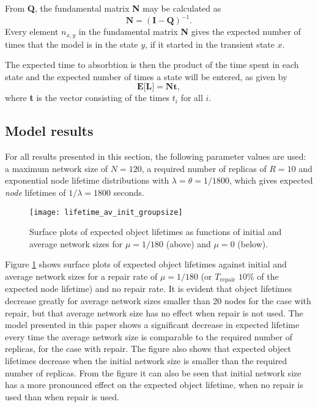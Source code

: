 From \textbf{Q}, the fundamental matrix \textbf{N} may be calculated as \cite{grinstead1997introduction_probability}
%
\begin{equation} \label{eq_fundamental_mat}
    \textbf{N} = (\textbf{I} - \textbf{Q})^{-1}.
\end{equation}
%
Every element $n_{x,y}$ in the fundamental matrix \textbf{N} gives the expected number of times that the model is in the state $y$, if it started in the transient state $x$.

The expected time to absorbtion is then the product of the time spent in each state and the expected number of times a state will be entered, as given by
%
\begin{equation} \label{expected_lifetime}
    \textbf{E[L]} = \textbf{Nt},
\end{equation}
%
where \textbf{t} is the vector consisting of the times $t_i$ for all $i$.

\subsection{Model results}
\label{results}

For all results presented in this section, the following parameter values are used: a maximum network size of $N=120$, a required number of replicas of $R = 10$ and exponential node lifetime distributions with $\lambda = \theta = 1/1800$, which gives expected \emph{node} lifetimes of $1/\lambda = 1800$ seconds.


\begin{figure}[htbp]
 \centering
 \texttt{[image: lifetime\_av\_init\_groupsize]}
 \caption{Surface plots of expected object lifetimes as functions of initial and average network sizes for $\mu = 1/180$ (above) and $\mu = 0$ (below).}
 \label{fig_lifetime_average_vs_initial}
\end{figure}
%
Figure \ref{fig_lifetime_average_vs_initial} shows surface plots of expected object lifetimes against initial and average network sizes for a repair rate of $\mu = 1/180$ (or $T_{\textrm{repair}}$ $10\%$ of the expected node lifetime) and no repair rate. It is evident that object lifetimes decrease greatly for average network sizes smaller than 20 nodes for the case with repair, but that average network size has no effect when repair is not used. The model presented in this paper shows a significant decrease in expected lifetime every time the average network size is comparable to the required number of replicas, for the case with repair. The figure also shows that expected object lifetimes decrease when the initial network size is smaller than the required number of replicas. From the figure it can also be seen that initial network size has a more pronounced effect on the expected object lifetime, when no repair is used than when repair is used.

